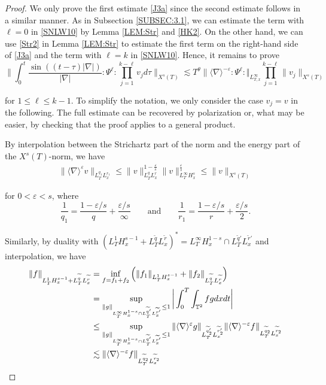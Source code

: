 \documentclass[letterpaper, 11pt,  reqno]{amsart}
\newcommand{\1}{\hspace{0.5mm}\text{I}\hspace{0.5mm}}
\newcommand{\noi}{\noindent}
\newcommand{\T}{\mathbb{T}}
\newcommand{\nb}{\nabla}
\newcommand{\eps}{\varepsilon}
\newcommand{\wt}{\widetilde}
\renewcommand{\l}{\ell}
\newcommand{\les}{\lesssim}
\newcommand{\jb}[1]
{\langle #1 \rangle}
\numberwithin{equation}{section}
\numberwithin{theorem}{section}
\begin{document}
\begin{proof} 
We only prove the first estimate \eqref{J3a} since the second estimate
follows in a similar manner.
As in Subsection \ref{SUBSEC:3.1}, 
we can estimate the term with $\l=0$ in \eqref{SNLW10} 
by Lemma \ref{LEM:Str} and \eqref{HK2}.
On the other hand, we can use \eqref{Str2} in Lemma \ref{LEM:Str}
to estimate 
the first term on the right-hand side of \eqref{J3a}
and 
the term with $\l=k$ in \eqref{SNLW10}.
Hence, it remains to prove
\begin{equation} 
\label{multilinear}  
\bigg\| \int_0^t \frac{\sin ((t-\tau )|\nb|)}{|\nb|} :\!\Psi^\l\!: \prod_{j = 1}^{k-\l}v_j  d\tau \bigg\|_{X^s(T)} 
\les  T^\theta \|\jb{\nb}^{-\eps} :\!\Psi^\l\!: \Vert_{L^\infty_{T, x}} \prod_{j=1}^{k-\l}  \| v_j \|_{X^s(T)}
\end{equation} 

\noi
for $1\leq \l\leq k-1$.
To simplify the notation,  we only consider the case  $v_j=v$ in the following. 
The full estimate can be recovered by polarization or, what may be easier, by checking that the proof applies to a general product. 



By interpolation between the Strichartz part of the norm and the energy part of the $X^s(T)$-norm,
we have
\begin{align}
 \|\jb{\nb}^\eps v \|_{L^{q_1}_T L^{r_1}_x} 
\le \|v \|_{L^{q}_TL^r_x}^{1-\frac{\eps}s}   \| v \|_{L^\infty_T H^s_x}^{\frac{\eps}s}  
\leq \|v \|_{X^s(T)}
\label{J4}
\end{align}



\noi
for $0 <  \eps < s$, where
\[ \frac{1}{q_1} = \frac{1-\eps/s}{q} + \frac{\eps/s}\infty \qquad 
\text{and}\qquad \frac{1}{r_1} = \frac{1-\eps/s}{r} + \frac{\eps/s}2.\] 



Similarly, 
by duality 
with $(L^1_T H^{s-1}_x+L^{\wt q}_T L^{\wt r}_x )^*
= L^\infty_T H^{1-s}_x \cap L^{\wt q'}_T L^{\wt r'}_x $
and interpolation, we have
\begin{align}
\| f \|_{L^1_T H^{s-1}_x+L^{\wt q}_T L^{\wt r}_x }
& = 
 \inf_{f = f_1+f_2} \Big(  
\| f_1 \|_{L^1_T H^{s-1}_x} +\| f_2 \|_{L^{\wt q}_T L^{\wt r}_x }\Big) \notag\\
& = \sup_{\|g\|_{L^\infty_T H^{1-s}_x \cap L^{\wt q'}_T L^{\wt r'}_x }\leq 1}
\bigg|\int_0^T \int_{\T^2} 
f g dx dt\bigg|\notag\\
& \le \sup_{\|g\|_{L^\infty_T H^{1-s}_x \cap L^{\wt q'}_T L^{\wt r'}_x }\leq 1}
 \| \jb{\nb}^{\eps} g \|_{L^{\wt q_2'}_T  L^{\wt r_2'}_x} 
 \| \jb{\nb}^{-\eps} f \|_{L^{\wt q_2}_T  L^{\wt r_2}_x} \notag\\
 & \les  \| \jb{\nb}^{-\eps} f \|_{L^{\wt q_2}_T  L^{\wt r_2}_x} 
\label{J5}
\end{align}



\end{proof}
\end{document}

